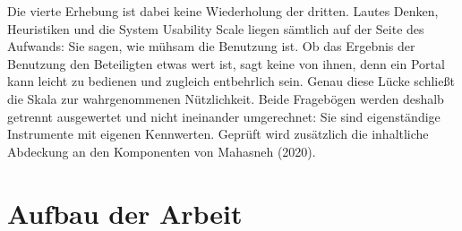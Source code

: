 Die vierte Erhebung ist dabei keine Wiederholung der dritten. Lautes Denken, Heuristiken und die System Usability Scale liegen sämtlich auf der Seite des Aufwands: Sie sagen, wie mühsam die Benutzung ist. Ob das Ergebnis der Benutzung den Beteiligten etwas wert ist, sagt keine von ihnen, denn ein Portal kann leicht zu bedienen und zugleich entbehrlich sein. Genau diese Lücke schließt die Skala zur wahrgenommenen Nützlichkeit. Beide Fragebögen werden deshalb getrennt ausgewertet und nicht ineinander umgerechnet: Sie sind eigenständige Instrumente mit eigenen Kennwerten. Geprüft wird zusätzlich die inhaltliche Abdeckung an den Komponenten von Mahasneh (2020).

\section{Aufbau der Arbeit}
\label{sec:aufbau}

